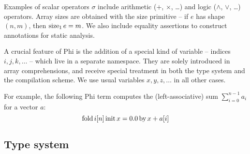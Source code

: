 Examples of scalar operators $\sigma$ include arithmetic ($+$, $\times$, \dots) and logic ($\land$, $\lor$, \dots) operators. Array sizes are obtained with the $\mathrm{size}$ primitive -- if $e$ has shape $(n, m)$, then $\mathrm{size}_{1}\, {e} = m$. We also include equality assertions to construct annotations for static analysis.

A crucial feature of Phi is the addition of a special kind of variable -- indices $i, j, k, \dots$ -- which live in a separate namespace. They are solely introduced in array comprehensions, and receive special treatment in both the type system and the compilation scheme. We use usual variables $x, y, z, \dots$ in all other cases.

For example, the following Phi term computes the (left-associative) sum $\sum_{i=0}^{n-1} a_i$ for a vector $a$:
$$ \mathrm{fold}\,{i}[{n}]\,\mathrm{init}\,{x} = {0.0}\,\mathrm{by}\,{x + a[i]} $$

\subsection{Type system}

\newcommand{\phifloattype}{\mathrm{Float}}
\newcommand{\phiinttype}{\mathrm{Int}}
\newcommand{\phinattype}{\phiinttype}
\newcommand{\phibooltype}{\mathrm{Bool}}
\newcommand{\phivectype}[1]{\Box{#1}}
\newcommand{\phipairtype}[2]{{#1} \times {#2}}

